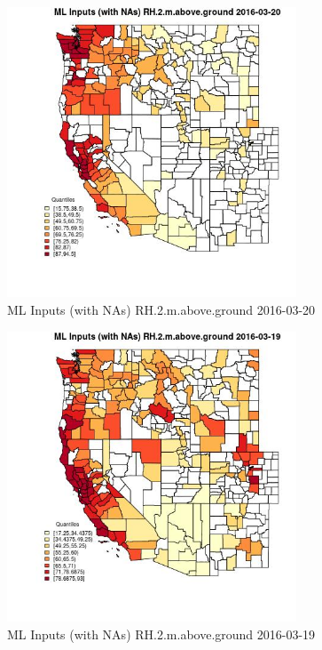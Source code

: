 \clearpage 

\begin{figure} 
\centering  
\includegraphics[width=0.77\textwidth]{Code_Outputs/Report_ML_input_PM25_Step4_part_e_de_duplicated_aveswNAs_CountyRH2mabovegroundMean2016-03-20_2016-03-20.jpg} 
\caption{\label{fig:Report_ML_input_PM25_Step4_part_e_de_duplicated_aveswNAsCountyRH2mabovegroundMean2016-03-20_2016-03-20}ML Inputs (with NAs) RH.2.m.above.ground 2016-03-20} 
\end{figure} 
 

\begin{figure} 
\centering  
\includegraphics[width=0.77\textwidth]{Code_Outputs/Report_ML_input_PM25_Step4_part_e_de_duplicated_aveswNAs_CountyRH2mabovegroundMean2016-03-19_2016-03-19.jpg} 
\caption{\label{fig:Report_ML_input_PM25_Step4_part_e_de_duplicated_aveswNAsCountyRH2mabovegroundMean2016-03-19_2016-03-19}ML Inputs (with NAs) RH.2.m.above.ground 2016-03-19} 
\end{figure} 
 

